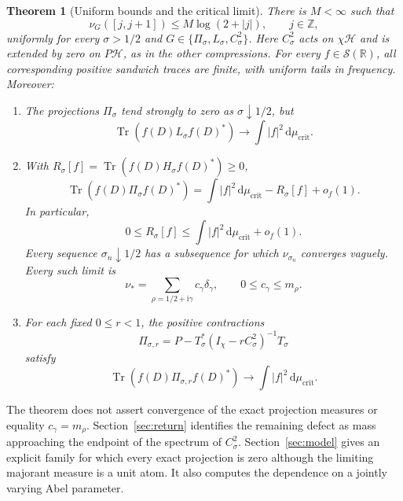 \documentclass[11pt]{article}
\numberwithin{equation}{section}
\newtheorem{theorem}{Theorem}[section]
\theoremstyle{definition}
\theoremstyle{remark}
\newcommand{\HH}{\mathcal H}
\newcommand{\Sch}{\mathcal S}
\newcommand{\Tr}{\operatorname{Tr}}
\newcommand{\ii}{\mathrm i}
\newcommand{\Id}{I}
\newcommand{\dd}{\,\mathrm d}
\newcommand{\mucrit}{\mu_{\mathrm{crit}}}
\begin{document}
\begin{theorem}[Uniform bounds and the critical limit]\label{thm:main}
There is \(M<\infty\) such that
\begin{equation}\label{eq:main-window}
\nu_G([j,j+1])\le M\log(2+|j|),\qquad j\in\mathbb Z,
\end{equation}
uniformly for every \(\sigma>1/2\) and
\(G\in\{\Pi_\sigma,L_\sigma,C_\sigma^2\}\).
Here \(C_\sigma^2\) acts on \(\chi\HH\) and is extended by zero on
\(P\HH\), as in the other compressions.
For every \(f\in\Sch(\mathbb R)\), all corresponding positive sandwich
traces are finite, with uniform tails in frequency. Moreover:
\begin{enumerate}
\item The projections \(\Pi_\sigma\) tend strongly to zero as
\(\sigma\downarrow1/2\), but
\[
\Tr(f(D)L_\sigma f(D)^*)\longrightarrow
\int |f|^2\dd\mucrit.
\]
\item With \(R_\sigma[f]=\Tr(f(D)H_\sigma f(D)^*)\ge0\),
\begin{equation}\label{eq:main-defect}
\Tr(f(D)\Pi_\sigma f(D)^*)
=\int|f|^2\dd\mucrit-R_\sigma[f]+o_f(1).
\end{equation}
In particular,
\[
0\le R_\sigma[f]\le\int|f|^2\dd\mucrit+o_f(1).
\]
Every sequence \(\sigma_n\downarrow1/2\) has a subsequence for which
\(\nu_{\sigma_n}\) converges vaguely. Every such limit is
\[
\nu_*=\sum_{\rho=1/2+\ii\gamma}c_\gamma\delta_\gamma,
\qquad 0\le c_\gamma\le m_\rho.
\]
\item For each fixed \(0\le r<1\), the positive contractions
\[
\Pi_{\sigma,r}=P-T_\sigma^*(\Id_\chi-rC_\sigma^2)^{-1}T_\sigma
\]
satisfy
\[
\Tr(f(D)\Pi_{\sigma,r}f(D)^*)\longrightarrow
\int |f|^2\dd\mucrit.
\]
\end{enumerate}
\end{theorem}

The theorem does not assert convergence of the exact projection measures
or equality \(c_\gamma=m_\rho\).
Section~\ref{sec:return} identifies the remaining defect as mass
approaching the endpoint of the spectrum of \(C_\sigma^2\).
Section~\ref{sec:model} gives an explicit family for which every exact
projection is zero although the limiting majorant measure is a unit atom.
It also computes the dependence on a jointly varying Abel parameter.
\end{document}
